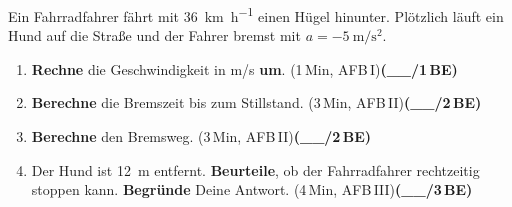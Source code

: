 \documentclass[11pt,a4paper]{article}
\newcommand{\BEZEIT}[3]{%
\hfill{\small\color{zeitgray}(#1\,Min, AFB\,#2)}\quad\textbf{(\_\_/#3\,BE)}%
}
\begin{document}
\newpage


\noindent{}

\vspace{0.4cm}

Ein Fahrradfahrer fährt mit \SI{36}{\kilo\metre\per\hour} einen Hügel hinunter. Plötzlich läuft ein Hund auf die Straße und der Fahrer bremst mit $a = \SI{-5}{\metre\per\second\squared}$.

\vspace{0.3cm}

\begin{enumerate}
\item[a)] \textbf{Rechne} die Geschwindigkeit in m/s \textbf{um}. \BEZEIT{1}{I}{1}

\vspace{2cm}

\item[b)] \textbf{Berechne} die Bremszeit bis zum Stillstand. \BEZEIT{3}{II}{2}

\vspace{4cm}

\item[c)] \textbf{Berechne} den Bremsweg. \BEZEIT{3}{II}{2}

\vspace{4cm}

\item[d)] Der Hund ist \SI{12}{\metre} entfernt. \textbf{Beurteile}, ob der Fahrradfahrer rechtzeitig stoppen kann. \textbf{Begründe} Deine Antwort. \BEZEIT{4}{III}{3}

\vspace{4cm}

\end{enumerate}

\newpage


\noindent{}
\end{document}
